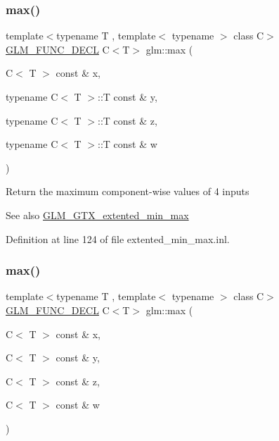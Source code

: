 \subsubsection{\texorpdfstring{max()}{max()}\hspace{0.1cm}{\footnotesize\ttfamily [5/6]}}
{\footnotesize\ttfamily template$<$typename T , template$<$ typename $>$ class C$>$ \\
\hyperlink{setup_8hpp_ab2d052de21a70539923e9bcbf6e83a51}{G\+L\+M\+\_\+\+F\+U\+N\+C\+\_\+\+D\+E\+CL} C$<$T$>$ glm\+::max (\begin{DoxyParamCaption}\item[{C$<$ T $>$ const \&}]{x,  }\item[{typename C$<$ T $>$\+::T const \&}]{y,  }\item[{typename C$<$ T $>$\+::T const \&}]{z,  }\item[{typename C$<$ T $>$\+::T const \&}]{w }\end{DoxyParamCaption})}

Return the maximum component-\/wise values of 4 inputs \begin{DoxySeeAlso}{See also}
\hyperlink{group__gtx__extented__min__max}{G\+L\+M\+\_\+\+G\+T\+X\+\_\+extented\+\_\+min\+\_\+max} 
\end{DoxySeeAlso}


Definition at line 124 of file extented\+\_\+min\+\_\+max.\+inl.

\mbox{\label{group__gtx__extented__min__max_gaacffbc466c2d08c140b181e7fd8a4858}} 
\subsubsection{\texorpdfstring{max()}{max()}\hspace{0.1cm}{\footnotesize\ttfamily [6/6]}}
{\footnotesize\ttfamily template$<$typename T , template$<$ typename $>$ class C$>$ \\
\hyperlink{setup_8hpp_ab2d052de21a70539923e9bcbf6e83a51}{G\+L\+M\+\_\+\+F\+U\+N\+C\+\_\+\+D\+E\+CL} C$<$T$>$ glm\+::max (\begin{DoxyParamCaption}\item[{C$<$ T $>$ const \&}]{x,  }\item[{C$<$ T $>$ const \&}]{y,  }\item[{C$<$ T $>$ const \&}]{z,  }\item[{C$<$ T $>$ const \&}]{w }\end{DoxyParamCaption})}


